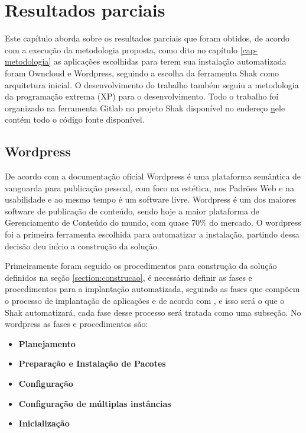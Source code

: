 \chapter{Resultados parciais}
\label{cap-resultados}

Este capítulo aborda sobre os resultados parciais que foram obtidos, de acordo
com a execução da metodologia proposta, como dito no capítulo \ref{cap-metodologia}
as aplicações escolhidas para terem sua instalação automatizada foram Owncloud e
Wordpress, seguindo a escolha da ferramenta Shak como arquitetura inicial. O
desenvolvimento do trabalho também seguiu a metodologia da programação extrema
(XP) para o desenvolvimento. Todo o trabalho foi organizado na ferramenta Gitlab
no projeto Shak disponível no endereço \href{https://gitlab.com/Shak/Shak/} nele
contém todo o código fonte disponível.
 
\section{Wordpress}
\label{sub:wordpress}

De acordo com a documentação oficial \cite{wordpress} Wordpress é uma plataforma
semântica de vanguarda para publicação pessoal, com foco na estética, nos
Padrões Web e na usabilidade e ao mesmo tempo é um software livre. Wordpress é
um dos maiores software de publicação de conteúdo, sendo hoje a maior
plataforma de Gerenciamento de Conteúdo do mundo, com quase 70\% do mercado. O
wordpress foi a primeira ferramenta escolhida para automatizar a instalação, partindo
dessa decisão deu início a construção da solução.

Primeiramente foram seguido os procedimentos para construção da solução definidos na seção \ref{section:construcao}, é
necessário definir as fases e procedimentos para a implantação automatizada,
seguindo as fases que compõem o processo de implantação de aplicações e de acordo
com \cite{omg2006}, e isso será o que o Shak automatizará, cada fase desse processo
 será tratada como uma subseção. No wordpress as fases e procedimentos são:

\begin{itemize}
  \item  \textbf{Planejamento}
  \item  \textbf{Preparação e Instalação de Pacotes}
  \item  \textbf{Configuração}
  \item  \textbf{Configuração de múltiplas instâncias}
  \item  \textbf{Inicialização}
\end{itemize}


